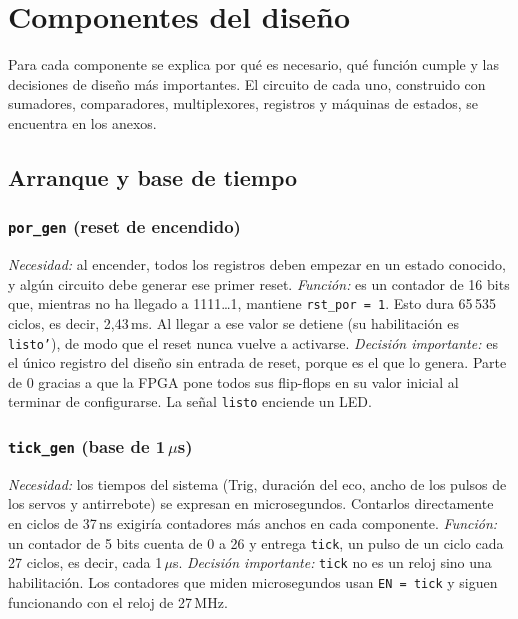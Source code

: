 \documentclass[conference]{IEEEtran}
\newcommand{\mo}[1]{\texttt{#1}}
\newcommand{\us}{\,$\mu$s}
\begin{document}
\section{Componentes del diseño}

Para cada componente se explica por qué es necesario, qué función cumple y las decisiones de diseño más importantes. El circuito de cada uno, construido con sumadores, comparadores, multiplexores, registros y máquinas de estados, se encuentra en los anexos.



\subsection{Arranque y base de tiempo}

\subsubsection{\mo{por\_gen} (reset de encendido)}
\emph{Necesidad:} al encender, todos los registros deben empezar en un estado conocido, y algún circuito debe generar ese primer reset.
\emph{Función:} es un contador de 16 bits que, mientras no ha llegado a 1111\ldots1, mantiene \mo{rst\_por = 1}. Esto dura 65\,535 ciclos, es decir, 2,43\,ms. Al llegar a ese valor se detiene (su habilitación es \mo{listo'}), de modo que el reset nunca vuelve a activarse.
\emph{Decisión importante:} es el único registro del diseño sin entrada de reset, porque es el que lo genera. Parte de 0 gracias a que la FPGA pone todos sus flip-flops en su valor inicial al terminar de configurarse. La señal \mo{listo} enciende un LED.

\subsubsection{\mo{tick\_gen} (base de 1\us)}
\emph{Necesidad:} los tiempos del sistema (Trig, duración del eco, ancho de los pulsos de los servos y antirrebote) se expresan en microsegundos. Contarlos directamente en ciclos de 37\,ns exigiría contadores más anchos en cada componente.
\emph{Función:} un contador de 5 bits cuenta de 0 a 26 y entrega \mo{tick}, un pulso de un ciclo cada 27 ciclos, es decir, cada 1\us.
\emph{Decisión importante:} \mo{tick} no es un reloj sino una habilitación. Los contadores que miden microsegundos usan \mo{EN = tick} y siguen funcionando con el reloj de 27\,MHz.
\end{document}
